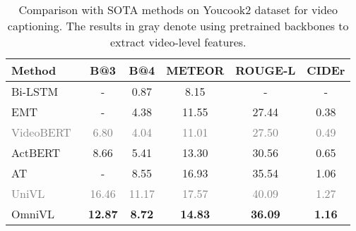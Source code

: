 \documentclass{article}
\makeatletter
\newcommand*{\system}{OmniVL\@\xspace}
\makeatother
\begin{document}
\begin{table*}[!ht]
\centering
  \caption{Comparison with SOTA methods on Youcook2 dataset for video captioning. The results in gray denote using pretrained backbones to extract video-level features. }
  \label{tab:vid_cap}
    \renewcommand{\arraystretch}{1.1}
    \vspace{0.05in}
    \begin{tabular*}{\linewidth}{@{\extracolsep{\fill}}l |ccccc@{}}
    \toprule
    \textbf{Method} &  B@3 & B@4 & METEOR & ROUGE-L & CIDEr \\
    \midrule
    Bi-LSTM~\cite{zhou2018towards} & - & 0.87 & 8.15 & - & -\\
    EMT~\cite{zhou2018end} & - & 4.38 & 11.55 & 27.44 & 0.38\\
    \textcolor{gray}{VideoBERT}~\cite{sun2019videobert} & \textcolor{gray}{6.80} & \textcolor{gray}{4.04} & \textcolor{gray}{11.01} & \textcolor{gray}{27.50} & \textcolor{gray}{0.49} \\
    ActBERT~\cite{zhu2020actbert}  & 8.66 & 5.41 & 13.30 & 30.56 & 0.65 \\
    AT~\cite{hessel2019case} & - & 8.55 & 16.93 & 35.54 & 1.06 \\
    \textcolor{gray}{UniVL}~\cite{luo2020univl} &  \textcolor{gray}{16.46} & \textcolor{gray}{11.17} & \textcolor{gray}{17.57} & \textcolor{gray}{40.09} & \textcolor{gray}{1.27} \\
\system & \textbf{12.87} & \textbf{8.72} & \textbf{14.83} & \textbf{36.09} & \textbf{1.16} \\
    \bottomrule
\end{tabular*}
\end{table*}
\end{document}
